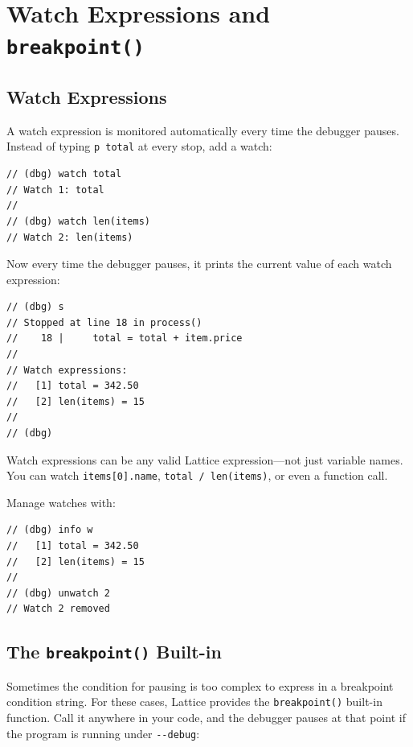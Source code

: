 \section{Watch Expressions and \texttt{breakpoint()}}\label{sec:watches}

\subsection{Watch Expressions}\label{sec:watch-expr}

A watch expression is monitored automatically every time the debugger pauses.
Instead of typing \lstinline|p total| at every stop, add a watch:

\begin{lstlisting}[language=Lattice, caption={Adding watch expressions}]
// (dbg) watch total
// Watch 1: total
//
// (dbg) watch len(items)
// Watch 2: len(items)
\end{lstlisting}

Now every time the debugger pauses, it prints the current value of each watch expression:

\begin{lstlisting}[language=Lattice, caption={Watch expressions displayed at each stop}]
// (dbg) s
// Stopped at line 18 in process()
//    18 |     total = total + item.price
//
// Watch expressions:
//   [1] total = 342.50
//   [2] len(items) = 15
//
// (dbg)
\end{lstlisting}

Watch expressions can be any valid Lattice expression---not just variable names.
You can watch \lstinline|items[0].name|, \lstinline|total / len(items)|, or even a function call.

Manage watches with:

\begin{lstlisting}[language=Lattice, caption={Managing watch expressions}]
// (dbg) info w
//   [1] total = 342.50
//   [2] len(items) = 15
//
// (dbg) unwatch 2
// Watch 2 removed
\end{lstlisting}

\subsection{The \texttt{breakpoint()} Built-in}\label{sec:breakpoint-fn}

Sometimes the condition for pausing is too complex to express in a breakpoint condition string.
For these cases, Lattice provides the \lstinline|breakpoint()| built-in function.
Call it anywhere in your code, and the debugger pauses at that point if the program is running under \lstinline|--debug|:

